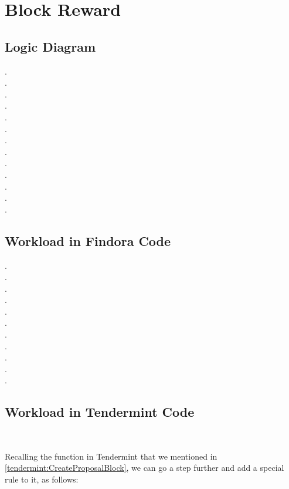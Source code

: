 \section{Block Reward}

\subsection{Logic Diagram}

. \\
. \\
. \\
. \\
. \\
. \\
. \\
. \\
. \\
. \\
. \\
. \\
. \\

\subsection{Workload in Findora Code}

. \\
. \\
. \\
. \\
. \\
. \\
. \\
. \\
. \\
. \\
. \\

\subsection{Workload in Tendermint Code}

~\par

Recalling the  function in Tendermint that we mentioned in \ref{tendermint:CreateProposalBlock},
we can go a step further and add a special rule to it, as follows:

